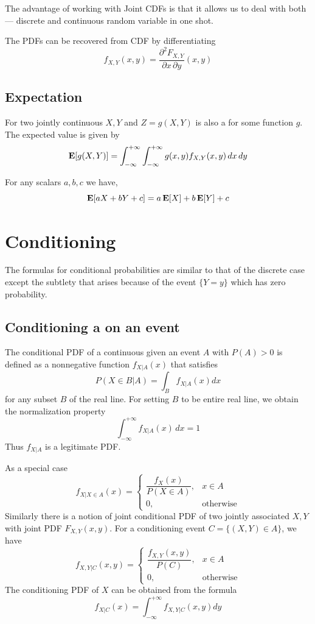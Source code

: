 The advantage of working with Joint CDFs is that it allows us to deal with both --- discrete and continuous random variable in one shot.

The PDFs can be recovered from CDF by differentiating
\[\boxed{f_{X,Y}(x,y)=\frac{\partial^2{F_{X,Y}}}{\partial x \, \partial y}(x,y)}\]

\subsection{Expectation}
For two jointly continuous \rv $X, Y$ and $Z=g(X,Y)$ is also a \rv for some function $g$. The expected value is given by
\[\operatorname{\textbf{E}}[g(X,Y)]=\int_{-\infty}^{+\infty}\int_{-\infty}^{+\infty}g(x,y)f_{X,Y}(x,y) \, dx \, dy\]

For any scalars $a, b, c$ we have,
\[\operatorname{\textbf{E}}[aX+bY+c]=a\operatorname{\textbf{E}}[X]+b\operatorname{\textbf{E}}[Y]+c\]

\section{Conditioning}
The formulas for conditional probabilities are similar to that of the discrete case except the subtlety that arises because of the event $\{Y=y\}$ which has zero probability.

\subsection{Conditioning a \RV on an event}
The conditional PDF of a continuous \rv given an event $A$ with $P(A)>0$ is defined as a nonnegative function $f_{X|A}(x)$ that satisfies
\[\boxed{P(X \in B| A) = \int_{B}f_{X|A}(x) dx}\]
for any subset $B$ of the real line. For setting $B$ to be entire real line, we obtain the normalization property
\[\int_{-\infty}^{+\infty}f_{X|A}(x) \, dx =1\]
Thus $f_{X|A}$ is a legitimate PDF.

As a special case
\[f_{X|X\in A}(x) = \begin{cases}
   \dfrac{f_X(x)}{P(X\in A)}, & x \in A \\
    0, & \text{otherwise}
\end{cases}\]
Similarly there is a notion of joint conditional PDF of two jointly associated \rv $X,Y$ with joint PDF $F_{X,Y}(x,y)$. For a conditioning event $C=\{(X,Y)\in A\}$, we have
\[f_{X,Y|C}(x,y)=\begin{cases}
    \dfrac{f_{X,Y}(x, y)}{P(C)}, & x \in A \\
     0, & \text{otherwise}
 \end{cases}\]
The conditioning PDF of $X$ can be obtained from the formula
\[f_{X|C}(x) = \int_{-\infty}^{+\infty} f_{X,Y|C}(x,y) dy\]

